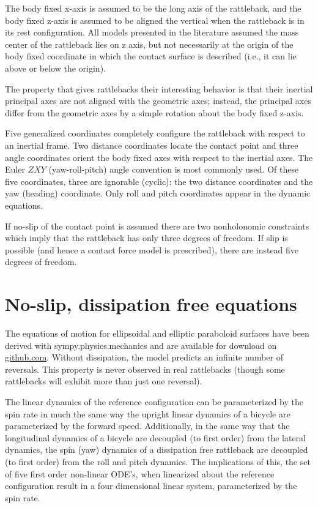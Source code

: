 \documentclass[letterpaper,11pt]{article}
\begin{document}
  The body fixed x-axis is assumed to be the long axis of the rattleback, and
  the body fixed z-axis is assumed to be aligned the vertical when the
  rattleback is in its rest configuration.  All models presented in the
  literature assumed the mass center of the rattleback lies on z axis, but not
  necessarily at the origin of the body fixed coordinate in which the contact
  surface is described (i.e., it can lie above or below the origin).

  The property that gives rattlebacks their interesting behavior is that their
  inertial principal axes are not aligned with the geometric axes; instead, the
  principal axes differ from the geometric axes by a simple rotation about the
  body fixed z-axis.

  Five generalized coordinates completely configure the rattleback with respect
  to an inertial frame.  Two distance coordinates locate the contact point and
  three angle coordinates orient the body fixed axes with respect to the
  inertial axes.  The Euler $ZXY$ (yaw-roll-pitch) angle convention is most
  commonly used.  Of these five coordinates, three are ignorable (cyclic): the
  two distance coordinates and the yaw (heading) coordinate.  Only roll and
  pitch coordinates appear in the dynamic equations.

  If no-slip of the contact point is assumed there are two nonholonomic
  constraints which imply that the rattleback has only three degrees of
  freedom.  If slip is possible (and hence a contact force model is
  prescribed), there are instead five degrees of freedom.

  \section{No-slip, dissipation free equations}
  The equations of motion for ellipsoidal and elliptic paraboloid surfaces have
  been derived with sympy.physics.mechanics and are available for download on
  \href{http://github.com/gilbertgede/pydy_examples}{github.com}.  Without
  dissipation, the model predicts an infinite number of reversals.  This
  property is never observed in real rattlebacks (though some rattlebacks will
  exhibit more than just one reversal).

  The linear dynamics of the reference configuration can be parameterized by
  the spin rate in much the same way the upright linear dynamics of a bicycle
  are parameterized by the forward speed.  Additionally, in the same way that
  the longitudinal dynamics of a bicycle are decoupled (to first order) from
  the lateral dynamics, the spin (yaw) dynamics of a dissipation free
  rattleback are decoupled (to first order) from the roll and pitch dynamics.
  The implications of this, the set of five first order non-linear ODE's, when
  linearized about the reference configuration result in a four dimensional
  linear system, parameterized by the spin rate.
\end{document}
